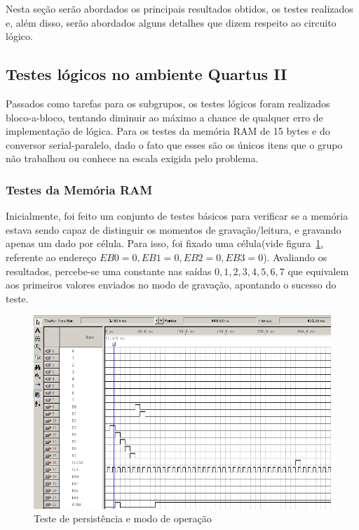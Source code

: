 \documentclass[12pt]{article}
\begin{document}
Nesta seção serão abordados os principais resultados obtidos, os testes realizados e, além disso, serão abordados alguns detalhes que dizem respeito ao circuito lógico.

\subsection{Testes lógicos no ambiente Quartus II}

Passados como tarefas para os subgrupos, os testes lógicos foram realizados bloco-a-bloco, tentando diminuir ao máximo a chance de qualquer erro de implementação de lógica. Para os testes da memória RAM de 15 bytes e do conversor serial-paralelo, dado o fato que esses são os únicos itens que o grupo não trabalhou ou conhece na escala exigida pelo problema.

\subsubsection{Testes da Memória RAM}

Inicialmente, foi feito um conjunto de testes básicos para verificar se a memória estava sendo capaz de distinguir os momentos de gravação/leitura, e gravando apenas um dado por célula. Para isso, foi fixado uma célula(vide figura~\ref{fig:ramtest}, referente ao endereço $EB0=0, EB1=0, EB2=0, EB3=0$). Avaliando os resultados, percebe-se uma constante nas saídas $0,1,2,3,4,5,6,7$ que equivalem aos primeiros valores enviados no modo de gravação, apontando o sucesso do teste.

\begin{figure}[h]
\centering
\includegraphics[width=1\textwidth]{img/testram1.png}
\caption{Teste de persistência e modo de operação}
\label{fig:ramtest}
\end{figure}
\end{document}
